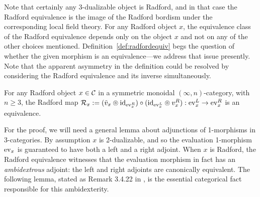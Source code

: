 \documentclass{amsart}
\begin{document}
Note that certainly any 3-dualizable object is Radford, and in that case the Radford equivalence is the image of the Radford bordism under the corresponding local field theory.  For any Radford object $x$, the equivalence class of the Radford equivalence depends only on the object $x$ and not on any of the other choices mentioned.  Definition~\ref{def:radfordequiv} begs the question of whether the given morphism is an equivalence---we address that issue presently.  Note that the apparent asymmetry in the definition could be resolved by considering the Radford equivalence and its inverse simultaneously.

\begin{proposition} \label{prop-Cat_Radford}
For any Radford object $x \in \mathcal C$ in a symmetric monoidal $(\infty,n)$-category, with $n \geq 3$, the Radford map $\mathcal R_x := (\tilde{v}_x \circledcirc \mathrm{id}_{\mathrm{ev}_x^R})\circ (\mathrm{id}_{\mathrm{ev}_x^L} \circledcirc v_x^R) : \mathrm{ev}_x^L \rightarrow \mathrm{ev}_x^R$ is an equivalence.
\end{proposition}

For the proof, we will need a general lemma about adjunctions of 1-morphisms in 3-categories.  By assumption $x$ is 2-dualizable, and so the evaluation 1-morphism $\mathrm{ev}_x$ is guaranteed to have both a left and a right adjoint.  When $x$ is Radford, the Radford equivalence witnesses that the evaluation morphism in fact has an \emph{ambidextrous} adjoint: the left and right adjoints are canonically equivalent.  The following lemma, stated as Remark 3.4.22 in \cite{lurie-ch}, is the essential categorical fact responsible for this ambidexterity.
\end{document}
